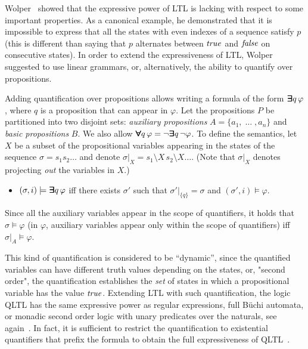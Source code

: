 Wolper~\cite{Wolper} showed that the expressive power of LTL is lacking with respect
to some important properties. As a canonical example, he demonstrated that it is impossible to
express that all the states with even indexes of a sequence
satisfy $p$ (this is
different than saying that $p$ alternates between $\mathit{true}$ and $\mathit{false}$ on consecutive states). In order to extend the expressiveness of LTL, Wolper suggested to use linear grammars, or, alternatively, the ability to quantify over
propositions. 


Adding quantification over propositions allows writing a formula of the form
$\bm{\exists}\kern-0.6em\bm{\exists} q \, \varphi$, where $q$ is a proposition that can appear in $\varphi$.
Let the propositions $P$ be partitioned into two disjoint sets: 
{\em auxiliary propositions} $A = \{ a_1 , \; \ldots\; , a_n \}$
and {\em basic propositions} $B$. 
We also allow $\bm{\forall}\kern-0.6em\bm{\forall} q\, \varphi =
\neg \bm{\exists}\kern-0.6em\bm{\exists} q\, \neg \varphi$.
To define the semantics, let $X$ be a subset of 
the propositional variables appearing in the states of the sequence $\sigma = s_1 s_2 \ldots$ and 
denote $\sigma |_X = s_1 \setminus X \, s_2 \setminus X \ldots$. (Note that $\sigma |_X$ denotes projecting {\em out} the variables in $X$.)



\begin{itemize}
\item $( \sigma, i ) \models \boldsymbol{\bm{\exists}\kern-0.6em\bm{\exists}} q \, \varphi$ iff there exists
$\sigma'$ such that $\sigma' |_{\{ q \} } = \sigma$ and 
$( \sigma', i) \models \varphi$.
\end{itemize}
Since all the auxiliary variables appear in the scope of
quantifiers, it holds that $\sigma \models \varphi$
(in $\varphi$, auxiliary variables appear only within
the scope of quantifiers)
iff $\sigma |_A \models \varphi$.


This kind of quantification is considered to be ``dynamic'', since the quantified variables can have different truth values depending on the states, or, "second order", the quantification establishes the {\em set} of states in which a propositional variable has the value $\mathit{true}$.
Extending LTL with such quantification, the logic QLTL has the same expressive power as regular expressions, full B\"{u}chi
automata, or monadic second order logic with unary predicates over the naturals, see again~\cite{Thomas}.
In fact, it is sufficient to restrict the quantification to existential quantifiers that prefix the formula to obtain the full expressiveness of QLTL~\cite{Thomas}. 

